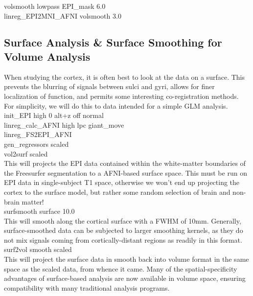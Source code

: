 \documentclass[final,titlepage,letterpaper,oneside,12pt]{article}
\renewcommand{\texttt}[2][BrickRed]{\textcolor{#1}{\ttfamily #2}}%
\begin{document}
\noindent
\texttt{volsmooth lowpass EPI\_mask 6.0} \\
\texttt{linreg\_EPI2MNI\_AFNI volsmooth 3.0} \\

\subsection{Surface Analysis \& Surface Smoothing for Volume Analysis}

When studying the cortex, it is often best to look at the data on a surface. This prevents the blurring of signals between sulci and gyri, allows for finer localization of function, and permits some interesting co-registration methods. For simplicity, we will do this to data intended for a simple GLM analysis. \\

\noindent
\texttt{init\_EPI high 0 alt+z off normal} \\
\texttt{linreg\_calc\_AFNI high lpc giant\_move} \\
\texttt{linreg\_FS2EPI\_AFNI} \\
\texttt{gen\_regressors scaled} \\

\noindent
\texttt{vol2surf scaled} \\

This will projects the EPI data contained within the white-matter boundaries of the Freesurfer segmentation to a AFNI-based surface space. This must be run on EPI data in single-subject T1 space, otherwise we won't end up projecting the cortex to the surface model, but rather some random selection of brain and non-brain matter! \\

\noindent
\texttt{surfsmooth surface 10.0} \\

This will smooth along the cortical surface with a FWHM of 10mm. Generally, surface-smoothed data can be subjected to larger smoothing kernels, as they do not mix signals coming from cortically-distant regions as readily in this format. \\

\noindent
\texttt{surf2vol smooth scaled} \\

This will project the surface data in smooth back into volume format in the same space as the scaled data, from whence it came. Many of the spatial-specificity advantages of surface-based analysis are now available in volume space, ensuring compatibility with many traditional analysis programs.
\end{document}
